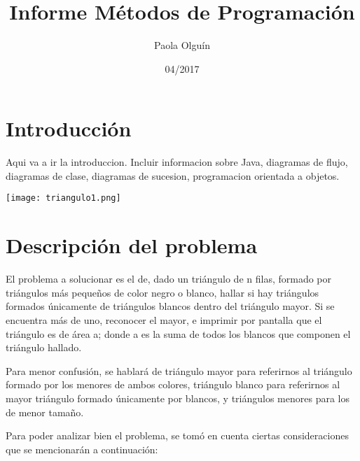 \documentclass{article}
\title{Informe M\'etodos de Programaci\'on}
\date{04/2017}
\author{Paola Olgu\'in}
\begin{document}

  \renewcommand*\contentsname{\'Indice}

  \maketitle{}

  \newpage


  \tableofcontents{}

  \section{Introducci\'on}
  Aqui va a ir la introduccion. Incluir informacion sobre Java, diagramas de flujo,
  diagramas de clase, diagramas de sucesion, programacion orientada a objetos.
  \\
  \begin{center}
  \texttt{[image: triangulo1.png]}
  \end{center}

  \newpage
  \section{Descripci\'on del problema}

  \par
  El problema a solucionar es el de, dado un triángulo de n filas,
  formado por triángulos más pequeños de color negro o blanco, hallar si hay
  triángulos formados únicamente de triángulos blancos dentro del triángulo
  mayor. Si se encuentra más de uno, reconocer el mayor, e imprimir por pantalla
  que el triángulo es de área a; donde a es la suma de todos los blancos que
  componen el triángulo hallado.\par
  Para menor confusión, se hablará de triángulo mayor para
  referirnos al triángulo formado por los menores de ambos colores, triángulo
  blanco para referirnos al mayor triángulo formado únicamente por blancos, y
  triángulos menores para los de menor tamaño.\par
  Para poder analizar bien el problema, se tomó en cuenta ciertas
  consideraciones que se mencionarán a continuación:
\end{document}
